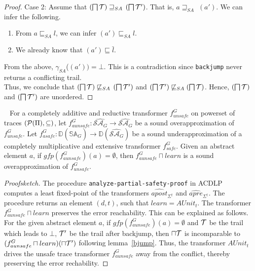 {{\begin{proof}
Case 2: Assume that $(\bigsqcap \mathcal{T}) \sqsupseteq_{SA}$ \ltrans$(\bigsqcap \mathcal{T}')$. 
That is, $a \sqsupseteq_{SA}$ \ltrans$(a')$. We can infer the following.
\begin{enumerate}
  \item From $a \sqsubseteq_{SA} l$, we can infer \ltrans$(a') \sqsubseteq_{SA} l$.
  \item We already know that \ltrans$(a') \sqsubseteq \bar{l}$.
\end{enumerate}
From the above, $\gamma_{SA}$(\ltrans$(a')) = \bot$. This is a contradiction since 
\texttt{backjump} never returns a conflicting trail. \\ 
	
Thus, we conclude that 
$(\bigsqcap \mathcal{T}) \not\sqsubseteq_{SA}$ \ltrans$(\bigsqcap \mathcal{T}')$ and 
\ltrans$(\bigsqcap \mathcal{T}') \not\sqsubseteq_{SA} (\bigsqcap \mathcal{T})$. Hence, 
$(\bigsqcap \mathcal{T})$ and \ltrans$(\bigsqcap \mathcal{T}')$ are unordered. 
\end{proof}
%
\begin{lemma}~\label{sound-transformer}
For a completely additive and reductive transformer $f_{unsafe}^G$ on powerset of traces 
$(\mathcal{P}(\Pi), \subseteq)$, let
$f_{aunsafe}^G \colon \widehat{\mathcal{SA}_{G}} \rightarrow \widehat{\mathcal{SA}_{G}}$ be 
a sound overapproximation of $f_{unsafe}^G$.  Let
$f_{asafe}^G \colon 
\mathbb{D}(\widehat{\mathbb{SA}_{G}}) \rightarrow \mathbb{D}(\widehat{\mathcal{SA}_{G}})$ be 
a sound underapproximation of a completely multiplicative and extensive transformer 
$f_{safe}^G$. Given an abstract element $a$, 
if $gfp(f_{aunsafe}^G)(a) = \emptyset$, then $f_{aunsafe}^G \sqcap learn$ 
is a sound overapproximation of $f_{unsafe}^G$. 
\end{lemma}

\begin{proof}[Proofsketch]
The procedure \texttt{analyze-partial-safety-proof} in ACDLP computes a least fixed-point
of the transformers $\widehat{apost}_{\Sigma^\dagger}$ and $\widehat{apre}_{\Sigma^\dagger}$.
The procedure returns an element $(d, t)$, such that $learn = AUnit_{t}$. The transformer 
$f_{aunsafe}^G \sqcap learn$ preserves the error reachability.  This can be explained as 
follows. For the given abstract element $a$, if $gfp(f_{aunsafe}^G)(a) = \emptyset$ and 
$\mathcal{T}$ be the trail which leads to $\bot$, $\mathcal{T}'$ be the trail after backjump, then
$\sqcap\mathcal{T}$ is incomparable to $(f_{aunsafe}^G \sqcap learn)(\sqcap\mathcal{T}')$ 
following lemma~\ref{bjump}. Thus, the transformer $AUnit_t$ drives the unsafe trace 
transformer $f_{aunsafe}^G$ away from the conflict, thereby preserving the error rechability. 
\end{proof}

}}
